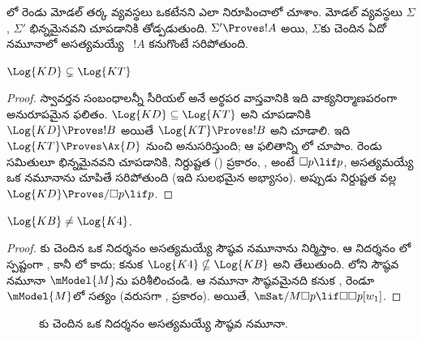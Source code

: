 \documentclass[../../../include/open-logic-section]{subfiles}
\begin{document}


లో రెండు మోడల్ తర్క వ్యవస్థలు ఒకటేనని
ఎలా నిరూపించాలో చూశాం. మోడల్ వ్యవస్థలు $\Sigma$, $\Sigma'$ భిన్నమైనవని
చూపడానికి  తోడ్పడుతుంది. $\Sigma' \Proves !A$
అయి, $\Sigma$కు చెందిన ఏదో నమూనాలో అసత్యమయ్యే
~$!A$ కనుగొంటే సరిపోతుంది.

\begin{prop}
  $\Log{KD} \subsetneq \Log{KT}$
\end{prop}

\begin{proof} స్వావర్తన సంబంధాలన్నీ సీరియల్ అనే అర్థపర వాస్తవానికి
  ఇది వాక్యనిర్మాణపరంగా అనురూపమైన ఫలితం. $\Log{KD} \subseteq
  \Log{KT}$ అని చూపడానికి $\Log{KD} \Proves !B$ అయితే
  $\Log{KT} \Proves !B$ అని చూడాలి. ఇది
  $\Log{KT} \Proves \Ax{D}$ నుంచి అనుసరిస్తుంది; ఆ ఫలితాన్ని
  లో చూపాం.
  రెండు సమితులూ భిన్నమైనవని చూపడానికి, నిర్దుష్టత
  () ప్రకారం, , అంటే
  $\Box p \lif p$, అసత్యమయ్యే ఒక  నమూనాను చూపితే సరిపోతుంది
  (ఇది సులభమైన అభ్యాసం). అప్పుడు నిర్దుష్టత వల్ల
  $\Log{KD} \Proves/ \Box p \lif p$.
\end{proof}

\begin{prop}
  $\Log{KB} \neq \Log{K4}$.
\end{prop}

\begin{proof}
  కు చెందిన ఒక నిదర్శనం అసత్యమయ్యే సౌష్ఠవ నమూనాను నిర్మిస్తాం.
  ఆ నిదర్శనం లో స్పష్టంగా
  , కానీ లో కాదు;
  కనుక $\Log{K4} \nsubseteq \Log{KB}$ అని తేలుతుంది.
  లోని సౌష్ఠవ నమూనా $\mModel{M}$ను పరిశీలించండి.
  ఆ నమూనా సౌష్ఠవమైనది కనుక ,  రెండూ
  $\mModel{M}$లో సత్యం (వరుసగా ,
   ప్రకారం). అయితే,
  $\mSat/{M}{\Box p \lif \Box\Box p}[w_1]$.
\end{proof}

\begin{figure}[htpb]
  \centering
  \caption{కు చెందిన ఒక నిదర్శనం అసత్యమయ్యే సౌష్ఠవ నమూనా.}
\end{figure}
\end{document}
